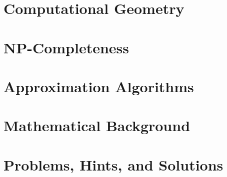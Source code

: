 \documentclass{book}
\begin{document}
\chapter{Computational Geometry}

\chapter{NP-Completeness}

\chapter{Approximation Algorithms}

\chapter{Mathematical Background}

\chapter{Problems, Hints, and Solutions}
\end{document}
